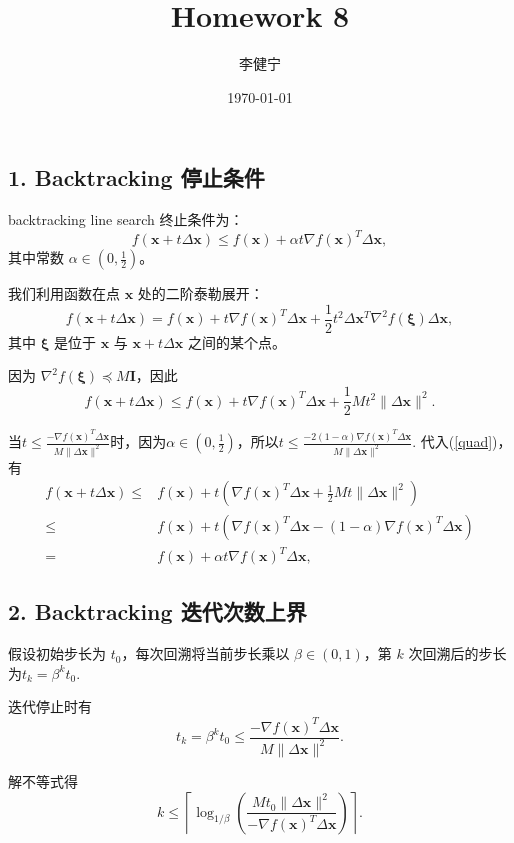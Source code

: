 \documentclass{homework}
\author{李健宁}
\date{\today}
\title{Homework 8}
\begin{document}
 \maketitle

\question

\begin{sol}
    \subsection*{1. Backtracking 停止条件}

backtracking line search 终止条件为：
\[f(\bm{x} + t \Delta \bm{x}) \leq f(\bm{x}) + \alpha t \nabla f(\bm{x})^T \Delta \bm{x},\]
其中常数 \( \alpha \in (0, \frac{1}{2}) \)。

我们利用函数在点 \( \bm{x} \) 处的二阶泰勒展开：
\[f(\bm{x} + t \Delta \bm{x}) = f(\bm{x}) + t \nabla f(\bm{x})^T \Delta \bm{x} + \frac{1}{2} t^2 \Delta \bm{x}^T \nabla^2 f(\bm{\xi}) \Delta \bm{x},\]
其中 \( \bm{\xi} \) 是位于 \( \bm{x} \) 与 \( \bm{x} + t \Delta \bm{x} \) 之间的某个点。

因为 \( \nabla^2 f(\bm{\xi}) \preceq M \bm{I} \)，因此
\begin{equation}\label{quad}
    f(\bm{x} + t \Delta \bm{x}) \leq f(\bm{x}) + t \nabla f(\bm{x})^T \Delta \bm{x} + \frac{1}{2} M t^2 \|\Delta \bm{x}\|^2.
\end{equation}

当\(t \leq \frac{-\nabla f(\bm{x})^T \Delta \bm{x}}{M \|\Delta \bm{x}\|^2}\)时，因为\( \alpha \in (0, \frac{1}{2}) \)，所以\(t \leq \frac{-2 (1 - \alpha) \nabla f(\bm{x})^T \Delta \bm{x}}{M \|\Delta \bm{x}\|^2}.\)
代入(\ref{quad})，有
\begin{align*}
f(\bm{x} + t \Delta \bm{x}) \leq &f(\bm{x}) + t (\nabla f(\bm{x})^T \Delta \bm{x} + \frac{1}{2} M t \|\Delta \bm{x}\|^2)\\
\leq& f(\bm{x}) +  t (\nabla f(\bm{x})^T \Delta \bm{x} - (1-\alpha)\nabla f(\bm{x})^T \Delta \bm{x})\\
= & f(\bm{x}) +  \alpha t \nabla f(\bm{x})^T \Delta \bm{x},
\end{align*}

\subsection*{2. Backtracking 迭代次数上界}

假设初始步长为 \( t_0 \)，每次回溯将当前步长乘以 \( \beta \in (0, 1) \)，第 \( k \) 次回溯后的步长为\(t_k = \beta^k t_0.\)

迭代停止时有
\[
t_k= \beta^k t_0 \leq \frac{-\nabla f(\bm{x})^T \Delta \bm{x}}{M \|\Delta \bm{x}\|^2}.
\]

解不等式得
\[
k \leq \left\lceil \log_{1/\beta} \left( \frac{M t_0 \|\Delta \bm{x}\|^2}{- \nabla f(\bm{x})^T \Delta \bm{x}} \right) \right\rceil.
\]
\end{sol}
\end{document}
